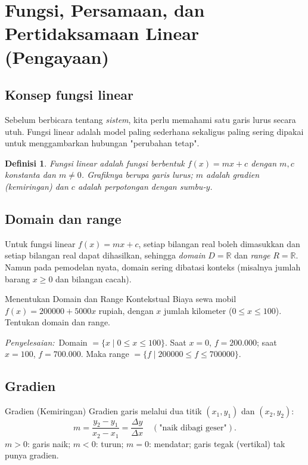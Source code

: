 \documentclass[11pt,a4paper]{report}
\theoremstyle{gaya}
\newtheorem{definisi}{Definisi}[chapter]
\newcommand{\jawab}{\par\smallskip\noindent\textit{\textcolor{oranye}{Penyelesaian:}}\ }
\begin{document}
\section{Fungsi, Persamaan, dan Pertidaksamaan Linear (Pengayaan)}

\subsection*{Konsep fungsi linear}
Sebelum berbicara tentang \emph{sistem}, kita perlu memahami satu garis lurus secara utuh. Fungsi linear adalah model paling sederhana sekaligus paling sering dipakai untuk menggambarkan hubungan "perubahan tetap".

\begin{definisi}
\emph{Fungsi linear} adalah fungsi berbentuk $f(x)=mx+c$ dengan $m,c$ konstanta dan $m\neq0$. Grafiknya berupa \emph{garis lurus}; $m$ adalah \emph{gradien} (kemiringan) dan $c$ adalah perpotongan dengan sumbu-$y$.
\end{definisi}

\subsection*{Domain dan range}
Untuk fungsi linear $f(x)=mx+c$, setiap bilangan real boleh dimasukkan dan setiap bilangan real dapat dihasilkan, sehingga \emph{domain} $D=\mathbb{R}$ dan \emph{range} $R=\mathbb{R}$. Namun pada pemodelan nyata, domain sering dibatasi konteks (misalnya jumlah barang $x\ge0$ dan bilangan cacah).

\begin{contoh}{Menentukan Domain dan Range Kontekstual}
Biaya sewa mobil $f(x)=200000+5000x$ rupiah, dengan $x$ jumlah kilometer ($0\le x\le 100$). Tentukan domain dan range.

\jawab Domain $=\{x\mid 0\le x\le100\}$. Saat $x=0$, $f=200{.}000$; saat $x=100$, $f=700{.}000$. Maka range $=\{f\mid 200000\le f\le700000\}$.
\end{contoh}

\subsection*{Gradien}
\begin{konsep}{Gradien (Kemiringan)}
Gradien garis melalui dua titik $(x_1,y_1)$ dan $(x_2,y_2)$:
\[
m=\frac{y_2-y_1}{x_2-x_1}=\frac{\Delta y}{\Delta x}\quad(\text{"naik dibagi geser"}).
\]
$m>0$: garis naik; $m<0$: turun; $m=0$: mendatar; garis tegak (vertikal) tak punya gradien.
\end{konsep}
\end{document}
